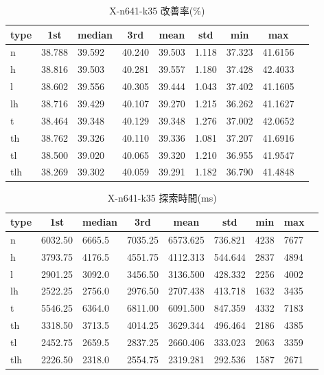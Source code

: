 \begin{table}[htbp]
    \caption{X-n641-k35 改善率(\%)}
    \begin{tabular}{|l|l|l|l|l|l|l|l|l|}\hline
    \multicolumn{1}{|c|}{\textbf{type}}
    &\multicolumn{1}{|c|}{\textbf{1st}}
    &\multicolumn{1}{c|}{\textbf{median}}
    &\multicolumn{1}{c|}{\textbf{3rd}}
    &\multicolumn{1}{c|}{\textbf{mean}}
    &\multicolumn{1}{c|}{\textbf{std}}
    &\multicolumn{1}{c|}{\textbf{min}}
    &\multicolumn{1}{c|}{\textbf{max}}\\\hline
	n & 38.788 & 39.592 & 40.240 & 39.503 & 1.118 & 37.323 & 41.6156\\\hline
	h & 38.816 & 39.503 & 40.281 & 39.557 & 1.180 & 37.428 & 42.4033\\\hline
	l & 38.602 & 39.556 & 40.305 & 39.444 & 1.043 & 37.402 & 41.1605\\\hline
	lh & 38.716 & 39.429 & 40.107 & 39.270 & 1.215 & 36.262 & 41.1627\\\hline
	t & 38.464 & 39.348 & 40.129 & 39.348 & 1.276 & 37.002 & 42.0652\\\hline
	th & 38.762 & 39.326 & 40.110 & 39.336 & 1.081 & 37.207 & 41.6916\\\hline
	tl & 38.500 & 39.020 & 40.065 & 39.320 & 1.210 & 36.955 & 41.9547\\\hline
	tlh & 38.269 & 39.302 & 40.059 & 39.291 & 1.182 & 36.790 & 41.4848\\\hline
	\end{tabular}
\end{table}
\begin{table}[htbp]
    \caption{X-n641-k35 探索時間(ms)}
    \begin{tabular}{|l|l|l|l|l|l|l|l|l|}\hline
    \multicolumn{1}{|c|}{\textbf{type}}
    &\multicolumn{1}{|c|}{\textbf{1st}}
    &\multicolumn{1}{c|}{\textbf{median}}
    &\multicolumn{1}{c|}{\textbf{3rd}}
    &\multicolumn{1}{c|}{\textbf{mean}}
    &\multicolumn{1}{c|}{\textbf{std}}
    &\multicolumn{1}{c|}{\textbf{min}}
    &\multicolumn{1}{c|}{\textbf{max}}\\\hline
	n & 6032.50 & 6665.5 & 7035.25 & 6573.625 & 736.821 & 4238 & 7677\\\hline
	h & 3793.75 & 4176.5 & 4551.75 & 4112.313 & 544.644 & 2837 & 4894\\\hline
	l & 2901.25 & 3092.0 & 3456.50 & 3136.500 & 428.332 & 2256 & 4002\\\hline
	lh & 2522.25 & 2756.0 & 2976.50 & 2707.438 & 413.718 & 1632 & 3435\\\hline
	t & 5546.25 & 6364.0 & 6811.00 & 6091.500 & 847.359 & 4332 & 7183\\\hline
	th & 3318.50 & 3713.5 & 4014.25 & 3629.344 & 496.464 & 2186 & 4385\\\hline
	tl & 2452.75 & 2659.5 & 2837.25 & 2660.406 & 333.023 & 2063 & 3359\\\hline
	tlh & 2226.50 & 2318.0 & 2554.75 & 2319.281 & 292.536 & 1587 & 2671\\\hline
	\end{tabular}
\end{table}
